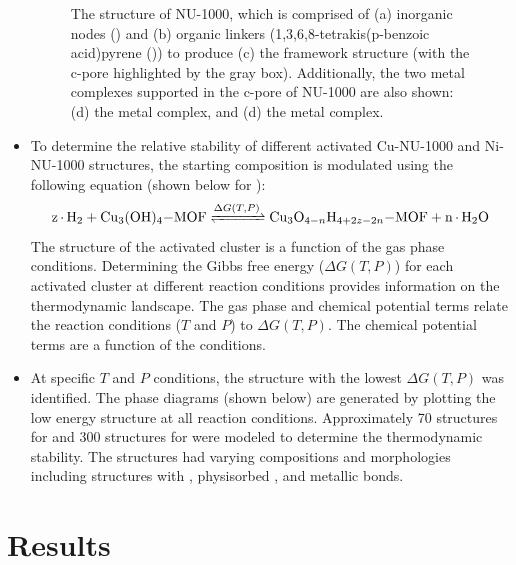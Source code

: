 \documentclass[12pt]{article}
\begin{document}
\begin{itemize}
\begin{figure}[H]
        \caption{The structure of NU-1000, which is comprised of (a)  inorganic nodes () and (b) organic linkers (1,3,6,8-tetrakis(p-benzoic acid)pyrene ()) to produce (c) the framework structure (with the c-pore highlighted by the gray box). Additionally, the two metal complexes supported in the c-pore of NU-1000 are also shown: (d) the  metal complex, and (d) the  metal complex.}
        \label{fig:MOFstructure}
    \end{figure}
    \item To determine the relative stability of different activated Cu-NU-1000 and Ni-NU-1000 structures, the starting composition is modulated using the following equation (shown below for ):
    \begin{equation} \label{exp:gibbsfreeoverall}
        \ce{z * H2 + Cu3(OH)4-MOF <=>[$\Delta G(T,P)$] Cu3O_{4-n}H_{4+2z-2n}-MOF + n * H2O}
    \end{equation}
     The structure of the activated cluster is a function of the gas phase conditions. Determining the Gibbs free energy ($\Delta G(T,P)$) for each activated cluster at different reaction conditions provides information on the thermodynamic landscape. The gas phase  and  chemical potential terms relate the reaction conditions ($T$ and $P$) to $\Delta G(T,P)$. The chemical potential terms are a function of the conditions. 
     \item At specific $T$ and $P$ conditions, the structure with the lowest $\Delta G(T,P)$ was identified. The phase diagrams (shown below) are generated by plotting the low energy structure at all reaction conditions. Approximately 70 structures for  and 300 structures for  were modeled to determine the thermodynamic stability. The structures had varying compositions and morphologies including structures with , physisorbed , and metallic bonds. 
\end{itemize}

\section{Results}
\end{document}
